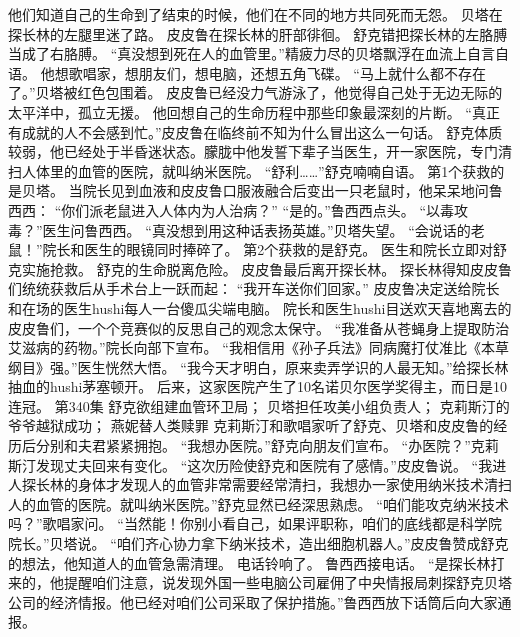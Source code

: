 \documentclass[a4paper,12pt,UTF8,twoside]{ctexbook}
\begin{document}
        他们知道自己的生命到了结束的时候，他们在不同的地方共同死而无怨。  
        贝塔在探长林的左腿里迷了路。  
        皮皮鲁在探长林的肝部徘徊。  
        舒克错把探长林的左胳膊当成了右胳膊。  
        “真没想到死在人的血管里。”精疲力尽的贝塔飘浮在血流上自言自语。  
        他想歌唱家，想朋友们，想电脑，还想五角飞碟。  
        “马上就什么都不存在了。”贝塔被红色包围着。  
        皮皮鲁已经没力气游泳了，他觉得自己处于无边无际的太平洋中，孤立无援。  
        他回想自己的生命历程中那些印象最深刻的片断。  
        “真正有成就的人不会感到忙。”皮皮鲁在临终前不知为什么冒出这么一句话。  
        舒克体质较弱，他已经处于半昏迷状态。朦胧中他发誓下辈子当医生，开一家医院，专门清扫人体里的血管的医院，就叫纳米医院。  
        “舒利……”舒克喃喃自语。  
        第1个获救的是贝塔。  
        当院长见到血液和皮皮鲁口服液融合后变出一只老鼠时，他呆呆地问鲁西西：  
        “你们派老鼠进入人体内为人治病？”  
        “是的。”鲁西西点头。  
        “以毒攻毒？”医生问鲁西西。  
        “真没想到用这种话表扬英雄。”贝塔失望。  
        “会说话的老鼠！”院长和医生的眼镜同时捧碎了。        
        第2个获救的是舒克。  
        医生和院长立即对舒克实施抢救。  
        舒克的生命脱离危险。  
        皮皮鲁最后离开探长林。  
        探长林得知皮皮鲁们统统获救后从手术台上一跃而起：  
        “我开车送你们回家。”  
        皮皮鲁决定送给院长和在场的医生hushi每人一台傻瓜尖端电脑。  
        院长和医生hushi目送欢天喜地离去的皮皮鲁们，一个个竞赛似的反思自己的观念太保守。  
        “我准备从苍蝇身上提取防治艾滋病的药物。”院长向部下宣布。  
        “我相信用《孙子兵法》同病魔打仗准比《本草纲目》强。”医生恍然大悟。  
        “我今天才明白，原来卖弄学识的人最无知。”给探长林抽血的hushi茅塞顿开。  
        后来，这家医院产生了10名诺贝尔医学奖得主，而日是10连冠。          第340集  
        舒克欲组建血管环卫局；  
        贝塔担任攻美小组负责人；  
        克莉斯汀的爷爷越狱成功；  
        燕妮替人类赎罪    
        克莉斯汀和歌唱家听了舒克、贝塔和皮皮鲁的经历后分别和夫君紧紧拥抱。  
        “我想办医院。”舒克向朋友们宣布。  
        “办医院？”克莉斯汀发现丈夫回来有变化。  
        “这次历险使舒克和医院有了感情。”皮皮鲁说。  
        “我进人探长林的身体才发现人的血管非常需要经常清扫，我想办一家使用纳米技术清扫人的血管的医院。就叫纳米医院。”舒克显然已经深思熟虑。  
        “咱们能攻克纳米技术吗？”歌唱家问。  
        “当然能！你别小看自己，如果评职称，咱们的底线都是科学院院长。”贝塔说。        
        “咱们齐心协力拿下纳米技术，造出细胞机器人。”皮皮鲁赞成舒克的想法，他知道人的血管急需清理。  
        电话铃响了。  
        鲁西西接电话。  
        “是探长林打来的，他提醒咱们注意，说发现外国一些电脑公司雇佣了中央情报局刺探舒克贝塔公司的经济情报。他已经对咱们公司采取了保护措施。”鲁西西放下话筒后向大家通报。  
\end{document}
